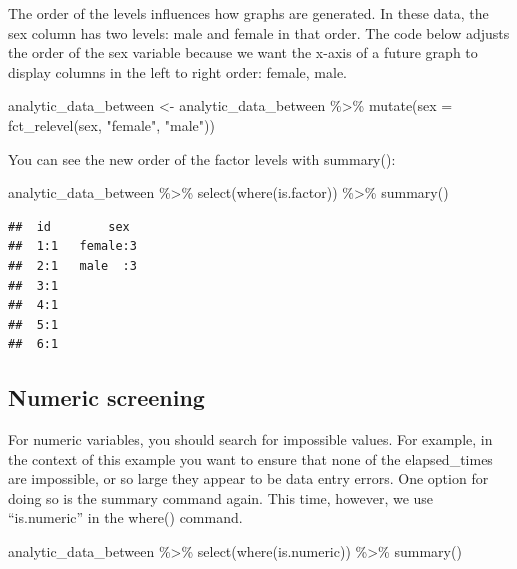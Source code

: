 \documentclass[
]{krantz}
\makeatletter
\newenvironment{Shaded}{\begin{snugshade}}{\end{snugshade}}
\newcommand{\AttributeTok}[1]{\textcolor[rgb]{0.61,0.61,0.61}{#1}}
\newcommand{\FunctionTok}[1]{\textcolor[rgb]{0,0,0}{#1}}
\newcommand{\NormalTok}[1]{#1}
\newcommand{\OtherTok}[1]{\textcolor[rgb]{0.37,0.37,0.37}{#1}}
\newcommand{\SpecialCharTok}[1]{\textcolor[rgb]{0,0,0}{#1}}
\newcommand{\StringTok}[1]{\textcolor[rgb]{0.5,0.5,0.5}{#1}}
\newenvironment{kframe}{%
\medskip{}
\setlength{\fboxsep}{.8em}
 \def\at@end@of@kframe{}%
 \ifinner\ifhmode%
  \def\at@end@of@kframe{\end{minipage}}%
  \begin{minipage}{\columnwidth}%
 \fi\fi%
 \def\FrameCommand##1{\hskip\@totalleftmargin \hskip-\fboxsep
 \colorbox{shadecolor}{##1}\hskip-\fboxsep
     \hskip-\linewidth \hskip-\@totalleftmargin \hskip\columnwidth}%
 \MakeFramed {\advance\hsize-\width
   \@totalleftmargin\z@ \linewidth\hsize
   \@setminipage}}%
 {\par\unskip\endMakeFramed%
 \at@end@of@kframe}
\renewenvironment{Shaded}{\begin{kframe}}{\end{kframe}}
\makeatother
\begin{document}
The order of the levels influences how graphs are generated. In these data, the sex column has two levels: male and female in that order. The code below adjusts the order of the sex variable because we want the x-axis of a future graph to display columns in the left to right order: female, male.

\begin{Shaded}
\begin{Highlighting}[]
\NormalTok{analytic\_data\_between }\OtherTok{\textless{}{-}}\NormalTok{ analytic\_data\_between }\SpecialCharTok{\%\textgreater{}\%}
  \FunctionTok{mutate}\NormalTok{(}\AttributeTok{sex =} \FunctionTok{fct\_relevel}\NormalTok{(sex,}
                           \StringTok{"female"}\NormalTok{,}
                           \StringTok{"male"}\NormalTok{))}
\end{Highlighting}
\end{Shaded}

You can see the new order of the factor levels with summary():

\begin{Shaded}
\begin{Highlighting}[]
\NormalTok{analytic\_data\_between }\SpecialCharTok{\%\textgreater{}\%}
  \FunctionTok{select}\NormalTok{(}\FunctionTok{where}\NormalTok{(is.factor)) }\SpecialCharTok{\%\textgreater{}\%}
  \FunctionTok{summary}\NormalTok{()}
\end{Highlighting}
\end{Shaded}

\begin{verbatim}
##  id        sex   
##  1:1   female:3  
##  2:1   male  :3  
##  3:1             
##  4:1             
##  5:1             
##  6:1
\end{verbatim}

\hypertarget{numeric-screening}{%
\subsection{Numeric screening}\label{numeric-screening}}

For numeric variables, you should search for impossible values. For example, in the context of this example you want to ensure that none of the elapsed\_times are impossible, or so large they appear to be data entry errors. One option for doing so is the summary command again. This time, however, we use ``is.numeric'' in the where() command.

\begin{Shaded}
\begin{Highlighting}[]
\NormalTok{analytic\_data\_between }\SpecialCharTok{\%\textgreater{}\%}
  \FunctionTok{select}\NormalTok{(}\FunctionTok{where}\NormalTok{(is.numeric)) }\SpecialCharTok{\%\textgreater{}\%}
  \FunctionTok{summary}\NormalTok{()}
\end{Highlighting}
\end{Shaded}
\end{document}
